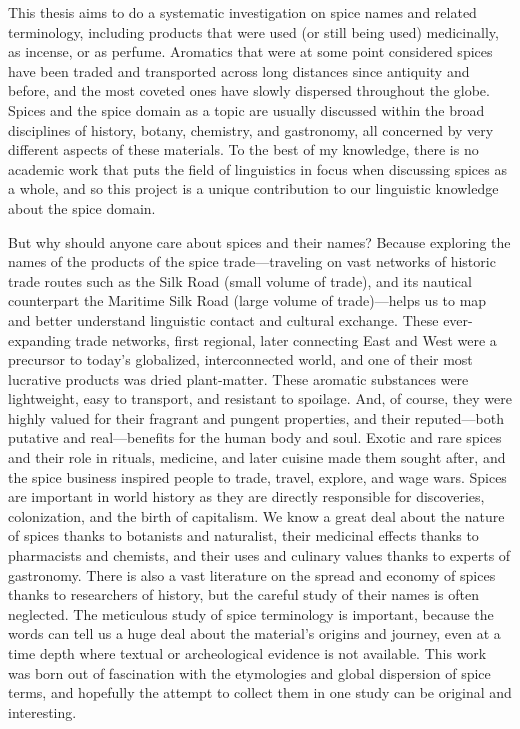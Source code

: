 This thesis aims to do a systematic investigation on spice names and related terminology, including products that were used (or still being used) medicinally, as incense, or as perfume. Aromatics that were at some point considered spices have been traded and transported across long distances since antiquity and before, and the most coveted ones have slowly dispersed throughout the globe. Spices and the spice domain as a topic are usually discussed within the broad disciplines of history, botany, chemistry, and gastronomy, all concerned by very different aspects of these materials. To the best of my knowledge, there is no academic work that puts the field of linguistics in focus when discussing spices as a whole, and so this project is a unique contribution to our linguistic knowledge about the spice domain.

But why should anyone care about spices and their names? Because exploring the names of the products of the spice trade---traveling on vast networks of historic trade routes such as the Silk Road (small volume of trade), and its nautical counterpart the Maritime Silk Road (large volume of trade)---helps us to map and better understand linguistic contact and cultural exchange. These ever-expanding trade networks, first regional, later connecting East and West were a precursor to today's globalized, interconnected world, and one of their most lucrative products was dried plant-matter. These aromatic substances were lightweight, easy to transport, and resistant to spoilage. And, of course, they were highly valued for their fragrant and pungent properties, and their reputed---both putative and real---benefits for the human body and soul. Exotic and rare spices and their role in rituals, medicine, and later cuisine made them sought after, and the spice business inspired people to trade, travel, explore, and wage wars. Spices are important in world history as they are directly responsible for discoveries, colonization, and the birth of capitalism. We know a great deal about the nature of spices thanks to botanists and naturalist, their medicinal effects thanks to pharmacists and chemists, and their uses and culinary values thanks to experts of gastronomy. There is also a vast literature on the spread and economy of spices thanks to researchers of history, but the careful study of their names is often neglected. The meticulous study of spice terminology is important, because the words can tell us a huge deal about the material's origins and journey, even at a time depth where textual or archeological evidence is not available. This work was born out of fascination with the etymologies and global dispersion of spice terms, and hopefully the attempt to collect them in one study can be original and interesting.

